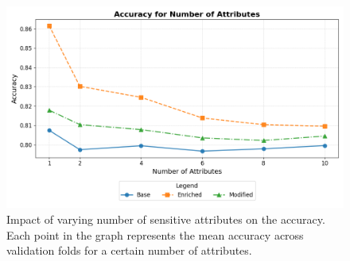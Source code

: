 \begin{figure}[h!]
    \centering
    \includegraphics[width=\imagewidth]{gfx/ablation_attributes_accuracy.png}
    \caption{Impact of varying number of sensitive attributes on the accuracy.
    Each point in the graph represents the mean accuracy across validation folds for a certain number of attributes.}

    \label{fig:ablation_attributes_accuracy}
\end{figure}

